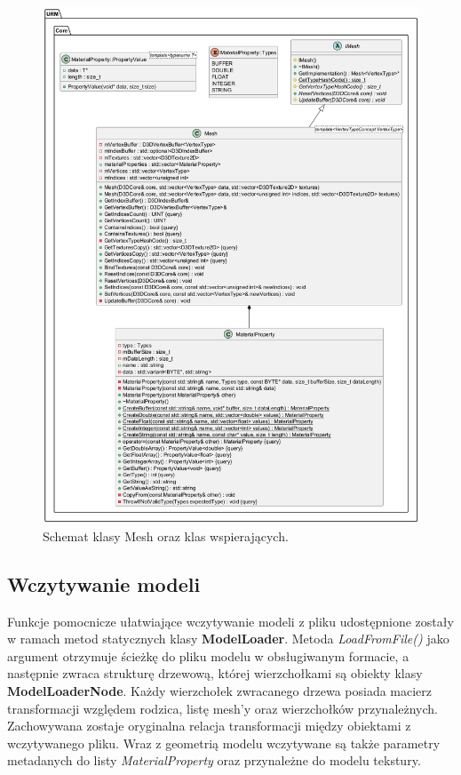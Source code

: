 	\begin{figure}[h!]
		\centering
		\includegraphics[width=\textwidth]{images/UML/mesh.png}
		\caption{Schemat klasy Mesh oraz klas wspierających.}
		\label{UML_Mesh}
	\end{figure}
	
		
	\vfill
	\clearpage
	
\subsection{Wczytywanie modeli}
	Funkcje pomocnicze ułatwiające wczytywanie modeli z pliku udostępnione zostały w ramach metod statycznych klasy \textbf{ModelLoader}. Metoda \textit{LoadFromFile()} jako argument otrzymuje ścieżkę do pliku modelu w obsługiwanym formacie, a następnie zwraca strukturę drzewową, której wierzchołkami są obiekty klasy \textbf{ModelLoaderNode}. Każdy wierzchołek zwracanego drzewa posiada macierz transformacji względem rodzica, listę mesh'y oraz wierzchołków przynależnych. Zachowywana zostaje oryginalna relacja transformacji między obiektami z wczytywanego pliku.
	Wraz z geometrią modelu wczytywane są także parametry metadanych do listy \textit{MaterialProperty} oraz przynależne do modelu tekstury. 
	
